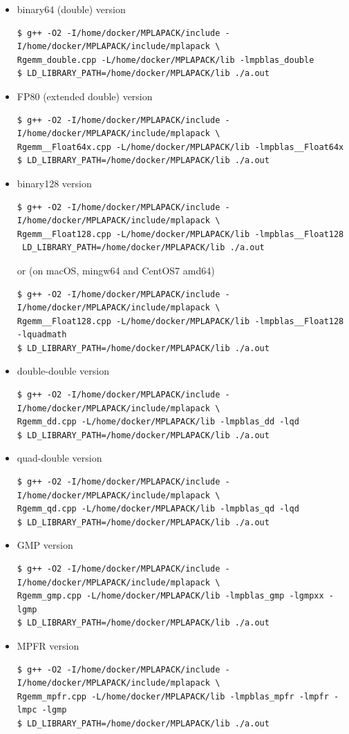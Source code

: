 \documentclass[12pt]{article}
\begin{document}
\begin{itemize}
    \item binary64 (double) version
\begin{verbatim}
$ g++ -O2 -I/home/docker/MPLAPACK/include -I/home/docker/MPLAPACK/include/mplapack \
Rgemm_double.cpp -L/home/docker/MPLAPACK/lib -lmpblas_double
$ LD_LIBRARY_PATH=/home/docker/MPLAPACK/lib ./a.out
\end{verbatim}
\item FP80 (extended double) version
\begin{verbatim}
$ g++ -O2 -I/home/docker/MPLAPACK/include -I/home/docker/MPLAPACK/include/mplapack \
Rgemm__Float64x.cpp -L/home/docker/MPLAPACK/lib -lmpblas__Float64x
$ LD_LIBRARY_PATH=/home/docker/MPLAPACK/lib ./a.out
\end{verbatim}
\item binary128 version
\begin{verbatim}
$ g++ -O2 -I/home/docker/MPLAPACK/include -I/home/docker/MPLAPACK/include/mplapack \
Rgemm__Float128.cpp -L/home/docker/MPLAPACK/lib -lmpblas__Float128
 LD_LIBRARY_PATH=/home/docker/MPLAPACK/lib ./a.out
\end{verbatim}
or (on macOS, mingw64 and CentOS7 amd64)
\begin{verbatim}
$ g++ -O2 -I/home/docker/MPLAPACK/include -I/home/docker/MPLAPACK/include/mplapack \
Rgemm__Float128.cpp -L/home/docker/MPLAPACK/lib -lmpblas__Float128 -lquadmath
$ LD_LIBRARY_PATH=/home/docker/MPLAPACK/lib ./a.out
\end{verbatim}
\item double-double version
\begin{verbatim}
$ g++ -O2 -I/home/docker/MPLAPACK/include -I/home/docker/MPLAPACK/include/mplapack \
Rgemm_dd.cpp -L/home/docker/MPLAPACK/lib -lmpblas_dd -lqd
$ LD_LIBRARY_PATH=/home/docker/MPLAPACK/lib ./a.out
\end{verbatim}
\item quad-double version
\begin{verbatim}
$ g++ -O2 -I/home/docker/MPLAPACK/include -I/home/docker/MPLAPACK/include/mplapack \
Rgemm_qd.cpp -L/home/docker/MPLAPACK/lib -lmpblas_qd -lqd
$ LD_LIBRARY_PATH=/home/docker/MPLAPACK/lib ./a.out
\end{verbatim}
\item GMP version
\begin{verbatim}
$ g++ -O2 -I/home/docker/MPLAPACK/include -I/home/docker/MPLAPACK/include/mplapack \
Rgemm_gmp.cpp -L/home/docker/MPLAPACK/lib -lmpblas_gmp -lgmpxx -lgmp
$ LD_LIBRARY_PATH=/home/docker/MPLAPACK/lib ./a.out
\end{verbatim}
\item MPFR version
\begin{verbatim}
$ g++ -O2 -I/home/docker/MPLAPACK/include -I/home/docker/MPLAPACK/include/mplapack \
Rgemm_mpfr.cpp -L/home/docker/MPLAPACK/lib -lmpblas_mpfr -lmpfr -lmpc -lgmp
$ LD_LIBRARY_PATH=/home/docker/MPLAPACK/lib ./a.out
\end{verbatim}
\end{itemize}
\end{document}

